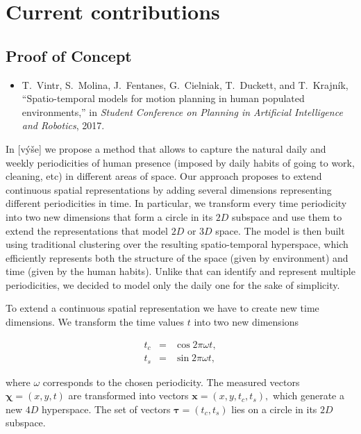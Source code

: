 \section{Current contributions}

\subsection{Proof of Concept}


\begin{itemize}
    \item T.~Vintr, S.~Molina, J.~Fentanes, G.~Cielniak, T.~Duckett, and T.~Krajn{\'i}k, ``Spatio-temporal models for motion planning in human populated environments,'' in \emph{Student Conference on Planning in Artificial Intelligence and Robotics}, 2017.
\end{itemize}

In [výše] we propose a method that allows to capture the natural daily and weekly periodicities of human presence (imposed by daily habits of going to work, cleaning, etc) in different areas of space.
Our approach proposes to extend continuous spatial representations by adding several dimensions representing different periodicities in time. 
In particular, we transform every time periodicity into two new dimensions that form a circle in its $2D$ subspace and use them to extend the representations that model $2D$ or $3D$ space. 
The model is then built using traditional clustering over the resulting spatio-temporal hyperspace, which efficiently represents both the structure of the space (given by environment) and time (given by the human habits).
Unlike \cite{krajnik2017fremen} that can identify and represent multiple periodicities, we decided to model only the daily one for the sake of simplicity.

To extend a continuous spatial representation we have to create new time dimensions.
We transform the time values $t$ into two new dimensions

\begin{equation}\label{trans_cos}
\begin{array}{ccc}
    t_c& = &\cos{2\pi \omega t},\\
    t_s& = &\sin{2\pi \omega t},
\end{array}
\end{equation}

\noindent where $\omega$ corresponds to the chosen periodicity.
The measured vectors $\mathbf{\chi} = (x, y, t)$ are transformed into vectors $\mathbf{x} = (x, y, t_c, t_s),$ which generate a new $4D$ hyperspace. 
The set of vectors $\mathbf{\tau} = (t_c, t_s)$ lies on a  circle  in its $2D$ subspace.


